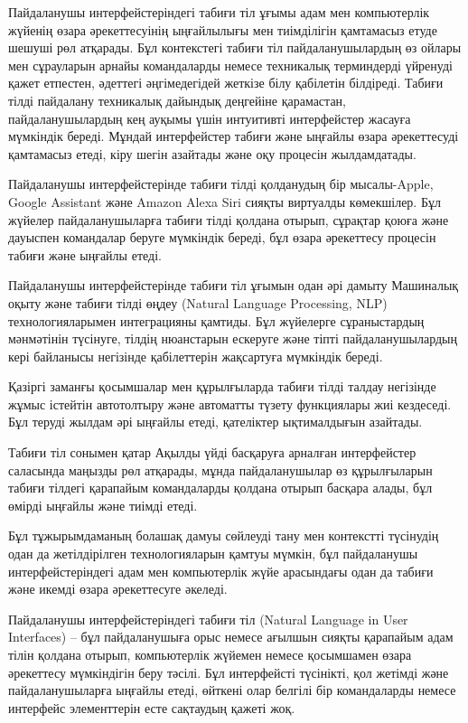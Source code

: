Пайдаланушы интерфейстеріндегі табиғи тіл ұғымы адам мен компьютерлік
жүйенің өзара әрекеттесуінің ыңғайлылығы мен тиімділігін қамтамасыз
етуде шешуші рөл атқарады. Бұл контекстегі табиғи тіл пайдаланушылардың
өз ойлары мен сұрауларын арнайы командаларды немесе техникалық
терминдерді үйренуді қажет етпестен, әдеттегі әңгімедегідей жеткізе білу
қабілетін білдіреді. Табиғи тілді пайдалану техникалық дайындық
деңгейіне қарамастан, пайдаланушылардың кең ауқымы үшін интуитивті
интерфейстер жасауға мүмкіндік береді. Мұндай интерфейстер табиғи және
ыңғайлы өзара әрекеттесуді қамтамасыз етеді, кіру шегін азайтады және
оқу процесін жылдамдатады.

Пайдаланушы интерфейстерінде табиғи тілді қолданудың бір мысалы-Apple,
Google Assistant және Amazon Alexa Siri сияқты виртуалды көмекшілер. Бұл
жүйелер пайдаланушыларға табиғи тілді қолдана отырып, сұрақтар қоюға
және дауыспен командалар беруге мүмкіндік береді, бұл өзара әрекеттесу
процесін табиғи және ыңғайлы етеді.

Пайдаланушы интерфейстерінде табиғи тіл ұғымын одан әрі дамыту Машиналық
оқыту және табиғи тілді өңдеу (Natural Language Processing, NLP)
технологияларымен интеграцияны қамтиды. Бұл жүйелерге сұраныстардың
мәнмәтінін түсінуге, тілдің нюанстарын ескеруге және тіпті
пайдаланушылардың кері байланысы негізінде қабілеттерін жақсартуға
мүмкіндік береді.

Қазіргі заманғы қосымшалар мен құрылғыларда табиғи тілді талдау
негізінде жұмыс істейтін автотолтыру және автоматты түзету функциялары
жиі кездеседі. Бұл теруді жылдам әрі ыңғайлы етеді, қателіктер
ықтималдығын азайтады.

Табиғи тіл сонымен қатар Ақылды үйді басқаруға арналған интерфейстер
саласында маңызды рөл атқарады, мұнда пайдаланушылар өз құрылғыларын
табиғи тілдегі қарапайым командаларды қолдана отырып басқара алады, бұл
өмірді ыңғайлы және тиімді етеді.

Бұл тұжырымдаманың болашақ дамуы сөйлеуді тану мен контекстті түсінудің
одан да жетілдірілген технологияларын қамтуы мүмкін, бұл пайдаланушы
интерфейстеріндегі адам мен компьютерлік жүйе арасындағы одан да табиғи
және икемді өзара әрекеттесуге әкеледі.

Пайдаланушы интерфейстеріндегі табиғи тіл (Natural Language in User
Interfaces) -- бұл пайдаланушыға орыс немесе ағылшын сияқты қарапайым
адам тілін қолдана отырып, компьютерлік жүйемен немесе қосымшамен өзара
әрекеттесу мүмкіндігін беру тәсілі. Бұл интерфейсті түсінікті, қол
жетімді және пайдаланушыларға ыңғайлы етеді, өйткені олар белгілі бір
командаларды немесе интерфейс элементтерін есте сақтаудың қажеті жоқ.

